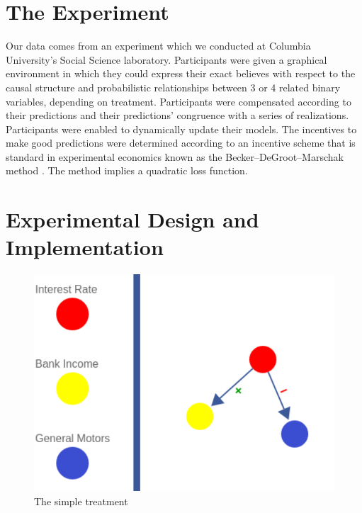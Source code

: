 \section{The Experiment} 

Our data comes from an experiment which we conducted at Columbia University's Social Science laboratory.  Participants were given a graphical environment in which they could express their exact believes with respect to the causal structure and probabilistic relationships between 3 or 4 related binary variables, depending on treatment.  Participants were compensated according to their predictions and their predictions' congruence with a series of realizations.  Participants were enabled to dynamically update their models.   The incentives to make good predictions were determined according to an incentive scheme that is standard in experimental economics known as the Becker–DeGroot–Marschak method \cite{Becker1964, Moldovanu98}.  The method implies a quadratic loss function. 

\section{Experimental Design and Implementation}

\begin{figure}[h!]
\begin{center}
\includegraphics[width=12cm]{figures/SimpleModel.pdf}
\caption{\footnotesize{The simple treatment}}
\label{fig:simp}
\end{center}
\end{figure}

